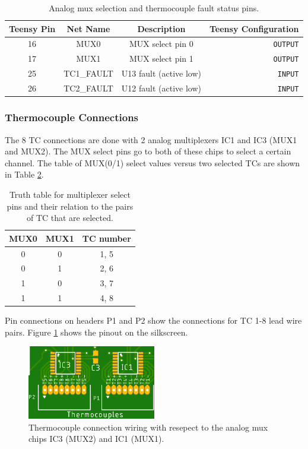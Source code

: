 \documentclass{article}
\begin{document}
\begin{table}[H]
    \centering
    \caption{Analog mux selection and thermocouple fault status pins.}
    \label{tab:pins_thermo}
    \begin{tabular}{c|c|c|r}
    Teensy Pin & Net Name  & Description   & Teensy Configuration \\
    \hline 
    16 & MUX0 & MUX select pin 0 & \texttt{OUTPUT} \\
    17 & MUX1 & MUX select pin 1 & \texttt{OUTPUT} \\
    25 & TC1\_FAULT & U13 fault (active low) & \texttt{INPUT} \\
    26 & TC2\_FAULT & U12 fault (active low) & \texttt{INPUT} \\ 
    \end{tabular}
\end{table}

\subsubsection{Thermocouple Connections}
The 8 TC connections are done with 2 analog multiplexers IC1 and IC3 (MUX1 and MUX2). The MUX select pins go to both of these chips to select a certain channel. The table of MUX(0/1) select values versus two selected TCs are shown in Table \ref{tab:tc-mux-sel}.

\begin{table}[H]
  \centering
  \caption{Truth table for multiplexer select pins and their relation to the pairs of TC that are selected.}
  \label{tab:tc-mux-sel}
  \begin{tabular}{c | c | c}
    MUX0 & MUX1 & TC number \\
    \hline
    0 & 0 & 1, 5 \\
    0 & 1 & 2, 6 \\
    1 & 0 & 3, 7 \\
    1 & 1 & 4, 8
  \end{tabular}
\end{table}
%
Pin connections on headers P1 and P2 show the connections for TC 1-8 lead wire pairs. Figure \ref{fig:tc-conn} shows the pinout on the silkscreen.
%
\begin{figure}[H]
    \centering
    \includegraphics[width=0.5\textwidth]{images/krepe-thermocouples.png}
    \caption{Thermocouple connection wiring with resepect to the analog mux chips IC3 (MUX2) and IC1 (MUX1).}
    \label{fig:tc-conn}
\end{figure}
\end{document}
